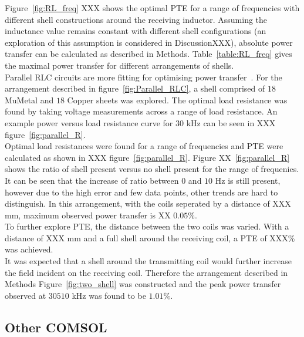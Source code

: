 \documentclass[11pt]{iopart}
\begin{document}
Figure~\ref{fig:RL_freq} XXX shows the optimal PTE for a range of
frequencies with different shell constructions around the receiving
inductor.  Assuming the inductance value remains constant with
different shell configurations (an exploration of this assumption is
considered in DiscussionXXX), absolute power transfer can be
calculated as described in Methods.  Table~\ref{table:RL_freq} gives
the maximal power transfer for different arrangements of shells.\\

Parallel RLC circuits are more fitting for optimising power
transfer~\cite{XXX}. For the arrangement described in
figure~\ref{fig:Parallel_RLC}, a shell comprised of $18$ MuMetal and $18$
Copper sheets was explored. The optimal load resistance was found by
taking voltage measurements across a range of load resistance. An
example power versus load resistance curve for $30$ kHz can be seen in
XXX figure~\ref{fig:parallel_R}.\\
Optimal load resistances were found for a range of frequencies and PTE
were calculated as shown in XXX figure~\ref{fig:parallel_R}. Figure
XX~\ref{fig:parallel_R} shows the ratio of shell present versus no
shell present for the range of frequenies. It can be seen that the
increase of ratio between $0$ and $10$ Hz is still present, however
due to the high error and few data points, other trends are hard to
distinguish. In this arrangement, with the coils seperated by a
distance of XXX mm, maximum observed power transfer is XX $0.05\%$.\\

To further explore PTE, the distance between the two coils was
varied. With a distance of XXX mm and a full shell around the
receiving coil, a PTE of XXX\% was achieved.\\

It was expected that a shell around the transmitting coil would
further increase the field incident on the receiving coil. Therefore
the arrangement described in Methods Figure~\ref{fig:two_shell} was
constructed and the peak power transfer observed at $30510$ kHz was
found to be $1.01\%$.\\



\subsection{Other COMSOL}
\end{document}
